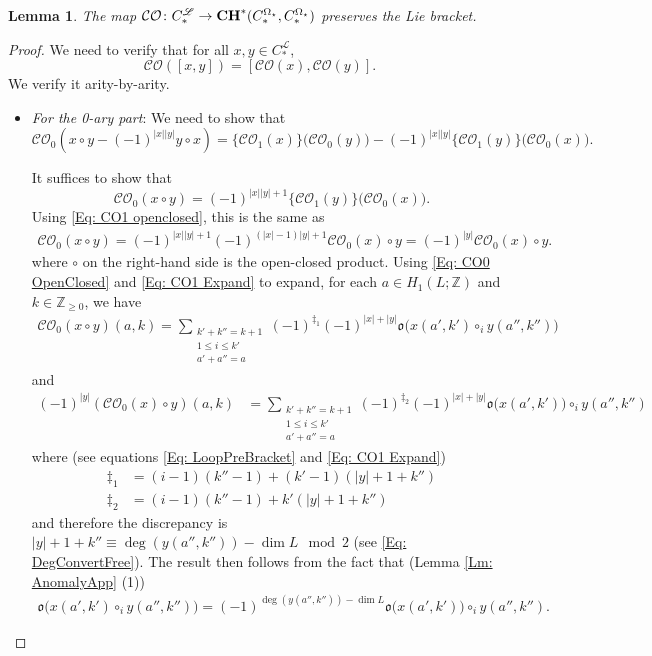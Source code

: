 \documentclass[10pt]{amsart}
\numberwithin{equation}{section}
\theoremstyle{plain}
\newtheorem{lemma}[theorem]{Lemma}
\theoremstyle{definition}
\theoremstyle{remark}
\numberwithin{equation}{section}
\newcommand{\Z}{\mathbb{Z}}
\newcommand{\CO}{\mathcal{CO}}
\newcommand{\CC}{\textbf{\textup{CH}}}
\newcommand{\CFr}{C_*^\mathscr{L}}
\newcommand{\CBa}{C_*^{\Omega_\star}}
\begin{document}
{\begin{lemma}\label{Lm: COpreserveLieApp}
	The map $\CO\colon \CFr\to \CC^*(\CBa,\CBa)$ preserves the Lie bracket.
\end{lemma}
\begin{proof}
	We need to verify that for all $x,y\in \CFr$,
\[ \CO([x,y])=[\CO(x),\CO(y)] .\]
	We verify it arity-by-arity.
\begin{itemize}
\item  \emph{For the 0-ary part}: 
We need to show that \[ \CO_0(x\circ y - (-1)^{|x||y|} y\circ x) = \big\{ \CO_1(x) \big\}\big(\CO_0(y)\big) - (-1)^{|x||y|} \big\{\CO_1(y)\big\} \big(\CO_0(x)\big). \]

It suffices to show that \[ \CO_0(x\circ y) = (-1)^{|x||y|+1}  \big\{\CO_1(y)\big\}\big(\CO_0(x)\big).\]
Using \eqref{Eq: CO1 openclosed}, this is the same as
\begin{align*}
	\CO_0(x\circ y) = (-1)^{|x||y|+1} (-1)^{(|x|-1)|y|+1} \CO_0(x)\circ y = (-1)^{|y|} \CO_0(x)\circ y.
\end{align*}
where $\circ$ on the right-hand side is the open-closed product.
Using \eqref{Eq: CO0 OpenClosed} and \eqref{Eq: CO1 Expand} to expand, for each $a\in H_1(L;\Z)$ and $k\in \Z_{\geq 0}$, we have
\begin{align*}
	\CO_0(x\circ y)(a,k) = \sum_{\substack{k'+k''=k+1\\1\leq i\leq k'\\ a'+a'' = a}}(-1)^{\ddagger_1} (-1)^{|x|+|y|}\mathfrak{o}\big(x(a',k')\circ_i y(a'',k'')\big)
\end{align*}
and 
\begin{align*}
	(-1)^{|y|}(\CO_0(x)\circ y)(a,k)&= \sum_{\substack{k'+k''=k+1\\1\leq i\leq k'\\ a'+a'' = a}}(-1)^{\ddagger_2} (-1)^{|x|+|y|}\mathfrak{o}\big(x(a',k')\big) \circ_i y(a'',k'')
\end{align*}
where (see equations \eqref{Eq: LoopPreBracket} and \eqref{Eq: CO1 Expand})
\begin{align*}
	\ddagger_1 &= (i-1)(k''-1)+(k'-1)(|y|+1+k'')\\
	\ddagger_2 &= (i-1)(k''-1) + k'(|y|+1+k'')
\end{align*}
and therefore the discrepancy is $|y|+1+k'' \equiv \deg(y(a'',k'')) -\dim L \mod 2$ (see \eqref{Eq: DegConvertFree}).
The result then follows from the fact that (Lemma \ref{Lm: AnomalyApp} (1))
\begin{align*}
	\mathfrak{o}\big(x(a',k')\circ_i y(a'',k'')\big) = (-1)^{\deg(y(a'',k'')) - \dim L} \mathfrak{o}\big(x(a',k')\big) \circ_i y(a'',k'').
\end{align*}




\end{itemize}
\end{proof}}
\end{document}
